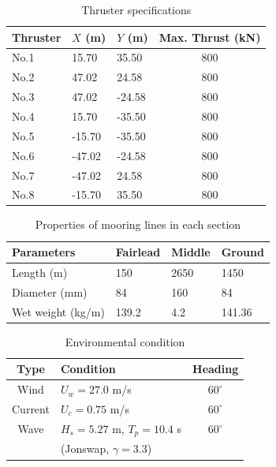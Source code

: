 \begin{sloppypar}
\begin{table}[ht!]
	\caption{Thruster specifications}
	\begin{center}
		\label{table_thruster}
		\begin{tabular}{l l l c}
			\hline
			Thruster & $X$ (m) & $Y$ (m) & Max. Thrust (kN) \\
			\hline
			No.1 & 15.70 & 35.50 & 800 \\
			No.2 & 47.02 & 24.58 & 800 \\
			No.3 & 47.02 & -24.58 & 800 \\
			No.4 & 15.70 & -35.50 & 800 \\
			No.5 & -15.70 & -35.50 & 800 \\
			No.6 & -47.02 & -24.58 & 800 \\
			No.7 & -47.02 & 24.58 & 800 \\
			No.8 & -15.70 & 35.50 & 800 \\
			\hline
		\end{tabular}
	\end{center}
\end{table}

\begin{table}[ht!]
	\caption{Properties of mooring lines in each section}
	\begin{center}
		\label{table_mooring}
		\begin{tabular}{l l l l}
			\hline
			Parameters & Fairlead &  Middle & Ground \\
			\hline
			Length (m) & 150 & 2650 & 1450 \\
			Diameter (mm) & 84 & 160 & 84 \\
			Wet weight (kg/m) & 139.2 & 4.2 & 141.36 \\
			\hline
		\end{tabular}
	\end{center}
\end{table}

\begin{table}[ht!]
	\caption{Environmental condition}
	\begin{center}
		\label{table_env}
		\begin{tabular}{c l c}
			\hline
			Type & Condition &  Heading \\
			\hline
			Wind & $U_w = 27.0$ m/s & $60^\circ$ \\
			Current & $U_c = 0.75$ m/s & $60^\circ$ \\
			Wave & $H_s = 5.27$ m, $T_p = 10.4$ s & $60^\circ$ \\
			& (Jonswap, $\gamma=3.3$) & \\
			\hline
		\end{tabular}
	\end{center}
\end{table}


\end{sloppypar}
